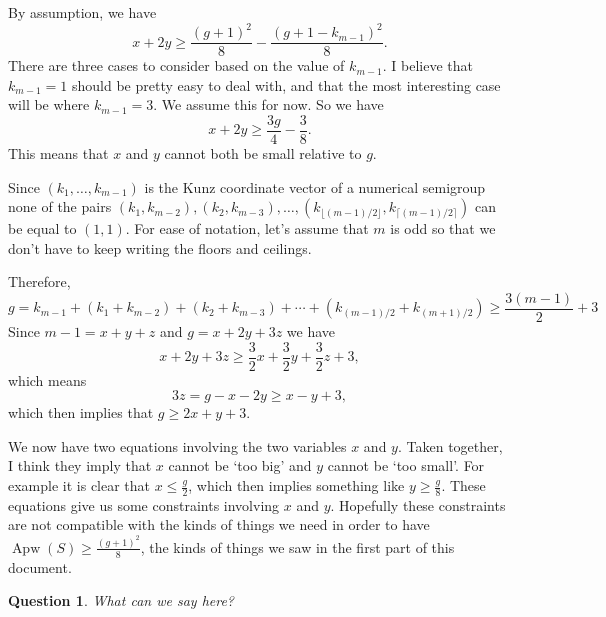 \documentclass{amsart}
\DeclareMathOperator{\Apw}{Apw}
\theoremstyle{plain}\newtheorem{proposition}{Proposition}[section]
\newtheorem{question}[proposition]{Question}
\theoremstyle{remark}\newtheorem{example}[proposition]{Example}
\begin{document}
By assumption, we have 
\[
x + 2y \ge \frac{(g+1)^2}{8} - \frac{(g+1-k_{m-1})^2}{8}.
\]
There are three cases to consider based on the value of $k_{m-1}$.  I believe that $k_{m-1} = 1$ should be pretty easy to deal with, and that the most interesting case will be where $k_{m-1} = 3$.  We assume this for now.  So we have 
\[
x+2y \ge \frac{3g}{4} - \frac{3}{8}.
\]
This means that $x$ and $y$ cannot both be small relative to $g$.  

Since $(k_1,\ldots, k_{m-1})$ is the Kunz coordinate vector of a numerical semigroup none of the pairs $(k_1, k_{m-2}), (k_2,k_{m-3}),\ldots, (k_{\lfloor{(m-1)/2}\rfloor},k_{\lceil (m-1)/2 \rceil})$ can be equal to $(1,1)$.  For ease of notation, let's assume that $m$ is odd so that we don't have to keep writing the floors and ceilings.

Therefore, 
\[
g = k_{m-1} + (k_1+k_{m-2}) + (k_2+k_{m-3}) + \cdots + (k_{(m-1)/2}+k_{(m+1)/2}) \ge \frac{3(m-1)}{2} +3
\]
Since $m-1 = x+y+z$ and $g = x+2y+3z$ we have 
\[
x+2y+3z \ge \frac{3}{2} x + \frac{3}{2} y + \frac{3}{2} z + 3,
\]
which means 
\[
3z = g-x-2y \ge x-y +3,
\]
which then implies that $g\ge 2x+y +3$.

We now have two equations involving the two variables $x$ and $y$.  Taken together, I think they imply that $x$ cannot be `too big' and $y$ cannot be `too small'.  For example it is clear that $x \le \frac{g}{2}$, which then implies something like $y \ge \frac{g}{8}$.   These equations give us some constraints involving $x$ and $y$.  Hopefully these constraints are not compatible with the kinds of things we need in order to have $\Apw(S) \ge \frac{(g+1)^2}{8}$, the kinds of things we saw in the first part of this document.

\begin{question}
What can we say here?
\end{question}
\end{document}
